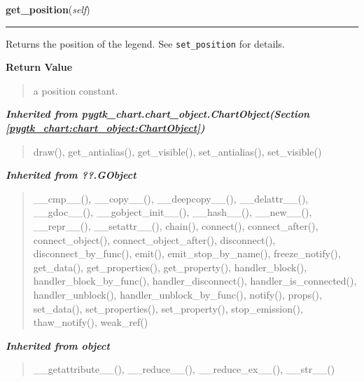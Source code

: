 \hspace{.8\funcindent}\begin{boxedminipage}{\funcwidth}

    \raggedright \textbf{get\_position}(\textit{self})

    \vspace{-1.5ex}

    \rule{\textwidth}{0.5\fboxrule}
\setlength{\parskip}{2ex}
    Returns the position of the legend. See \texttt{set\_position} for 
    details.

\setlength{\parskip}{1ex}
      \textbf{Return Value}
    \vspace{-1ex}

      \begin{quote}
      a position constant.

      \end{quote}

    \end{boxedminipage}


\large{\textbf{\textit{Inherited from pygtk\_chart.chart\_object.ChartObject\textit{(Section \ref{pygtk_chart:chart_object:ChartObject})}}}}

\begin{quote}
draw(), get\_antialias(), get\_visible(), set\_antialias(), set\_visible()
\end{quote}

\large{\textbf{\textit{Inherited from ??.GObject}}}

\begin{quote}
\_\_cmp\_\_(), \_\_copy\_\_(), \_\_deepcopy\_\_(), \_\_delattr\_\_(), \_\_gdoc\_\_(), \_\_gobject\_init\_\_(), \_\_hash\_\_(), \_\_new\_\_(), \_\_repr\_\_(), \_\_setattr\_\_(), chain(), connect(), connect\_after(), connect\_object(), connect\_object\_after(), disconnect(), disconnect\_by\_func(), emit(), emit\_stop\_by\_name(), freeze\_notify(), get\_data(), get\_properties(), get\_property(), handler\_block(), handler\_block\_by\_func(), handler\_disconnect(), handler\_is\_connected(), handler\_unblock(), handler\_unblock\_by\_func(), notify(), props(), set\_data(), set\_properties(), set\_property(), stop\_emission(), thaw\_notify(), weak\_ref()
\end{quote}

\large{\textbf{\textit{Inherited from object}}}

\begin{quote}
\_\_getattribute\_\_(), \_\_reduce\_\_(), \_\_reduce\_ex\_\_(), \_\_str\_\_()
\end{quote}

